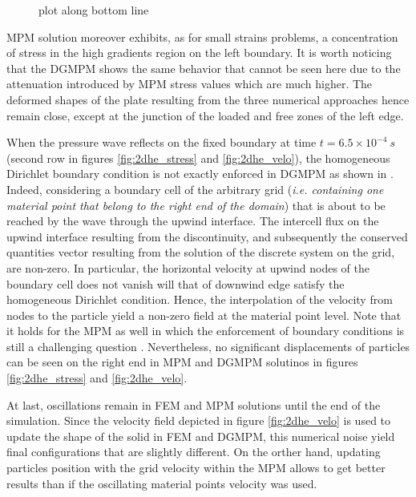 \begin{figure}[h!]
  \centering
  
  \caption{plot along bottom line}
\end{figure}
MPM solution moreover exhibits, as for small strains problems, a concentration of stress in the high gradients region on the left boundary. It is worth noticing that the DGMPM shows the same behavior that cannot be seen here due to the attenuation introduced by MPM stress values which are much higher.
The deformed shapes of the plate resulting from the three numerical approaches hence remain close, except at the junction of the loaded and free zones of the left edge.

When the pressure wave reflects on the fixed boundary at time $t=6.5\times 10^{-4}\:s$ (second row in figures \ref{fig:2dhe_stress} and \ref{fig:2dhe_velo}), the homogeneous Dirichlet boundary condition is not exactly enforced in DGMPM as shown in \cite{DGMPM}.
Indeed, considering a boundary cell of the arbitrary grid (\textit{i.e. containing one material point that belong to the right end of the domain}) that is about to be reached by the wave through the upwind interface.
The intercell flux on the upwind interface resulting from the discontinuity, and subsequently the conserved quantities vector resulting from the solution of the discrete system on the grid, are non-zero.
In particular, the horizontal velocity at upwind nodes of the boundary cell does not vanish will that of downwind edge satisfy the homogeneous Dirichlet condition. 
Hence, the interpolation of the velocity from nodes to the particle yield a non-zero field at the material point level.
Note that it holds for the MPM as well in which the enforcement of boundary conditions is still a challenging question \cite{BC_MPM}.
Nevertheless, no significant displacements of particles can be seen on the right end in MPM and DGMPM solutinos in figures \ref{fig:2dhe_stress} and \ref{fig:2dhe_velo}.

At last, oscillations remain in FEM and MPM solutions until the end of the simulation. 
Since the velocity field depicted in figure \ref{fig:2dhe_velo} is used to update the shape of the solid in FEM and DGMPM, this numerical noise yield final configurations that are slightly different.
On the orther hand, updating particles position with the grid velocity within the MPM allows to get better results than if the oscillating material points velocity was used.

